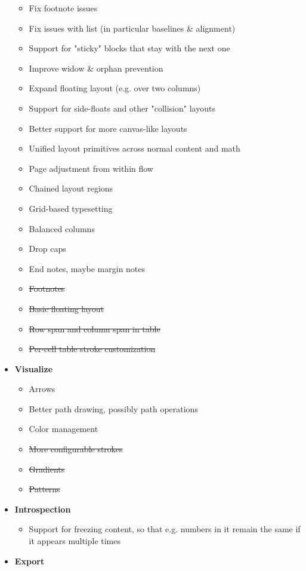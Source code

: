 \begin{itemize}
  \begin{itemize}
  \tightlist
  \item
    Fix footnote issues
  \item
    Fix issues with list (in particular baselines \& alignment)
  \item
    Support for "sticky" blocks that stay with the next one
  \item
    Improve widow \& orphan prevention
  \item
    Expand floating layout (e.g. over two columns)
  \item
    Support for side-floats and other "collision" layouts
  \item
    Better support for more canvas-like layouts
  \item
    Unified layout primitives across normal content and math
  \item
    Page adjustment from within flow
  \item
    Chained layout regions
  \item
    Grid-based typesetting
  \item
    Balanced columns
  \item
    Drop caps
  \item
    End notes, maybe margin notes
  \item
    \st{Footnotes}
  \item
    \st{Basic floating layout}
  \item
    \st{Row span and column span in table}
  \item
    \st{Per-cell table stroke customization}
  \end{itemize}
\item
  \textbf{Visualize}

  \begin{itemize}
  \tightlist
  \item
    Arrows
  \item
    Better path drawing, possibly path operations
  \item
    Color management
  \item
    \st{More configurable strokes}
  \item
    \st{Gradients}
  \item
    \st{Patterns}
  \end{itemize}
\item
  \textbf{Introspection}

  \begin{itemize}
  \tightlist
  \item
    Support for freezing content, so that e.g. numbers in it remain the
    same if it appears multiple times
  \end{itemize}
\item
  \textbf{Export}


\end{itemize}
